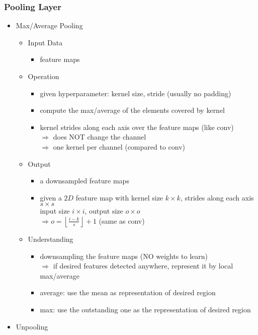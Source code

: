 \subsubsection{Pooling Layer}
\begin{itemize}
\item Max/Average Pooling
	\begin{itemize}
	\item Input Data
		\begin{itemize}
		\item feature maps
		\end{itemize}
	\item Operation
		\begin{itemize}
		\item given hyperparameter: kernel size, stride (usually no padding)
		\item compute the max/average of the elements covered by kernel
		\item kernel strides along each axis over the feature maps (like conv) \\
		$\Rightarrow$ does NOT change the channel \\
		$\Rightarrow$ one kernel per channel (compared to conv)
		\end{itemize}
	\item Output
		\begin{itemize}
		\item a downsampled feature maps
		\item given a $2D$ feature map with kernel size $k \times k$, strides along each axis $s\times s$ \\
		input size $i\times i$, output size $o\times o$ \\
		$\Rightarrow o = \left\lfloor \frac {i-k} {s} \right\rfloor + 1$ (same as conv)
		\end{itemize}
	\item Understanding
		\begin{itemize}
		\item downsampling the feature maps (NO weights to learn) \\ 
		$\Rightarrow$ if desired features detected anywhere, represent it by local max/average
		\item average: use the mean as representation of desired region
		\item max: use the outstanding one as the representation of desired region
		\end{itemize}
	\end{itemize}
\item Unpooling

\end{itemize}
